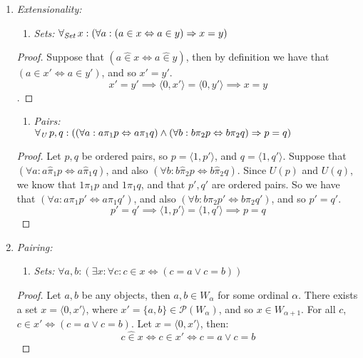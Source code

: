 \documentclass[11pt]{report}
\newcommand{\all}[1]{\forall_{\mathit{#1}}\hspace{0.5mm}}
\newcommand{\pleft}{\mathrel{\pi_1}}
\newcommand{\pright}{\mathrel{\pi_2}}
\newcommand{\pair}[2]{\langle #1,#2 \rangle}
\newcommand{\zin}{\mathrel{\widehat{\in}}}
\newcommand{\zpright}{\mathrel{\widehat{\pi}_2}}
\newcommand{\zpleft}{\mathrel{\widehat{\pi}_1}}
\theoremstyle{definition}
\theoremstyle{theorem}
\theoremstyle{lemma}
\begin{document}
\begin{enumerate}[resume=axiomlist, label=\Roman*.]
  \item \textit{Extensionality:}
  \begin{enumerate}[series=sublist, label=(\roman*)]
    \item \textit{Sets:} $\all{Set} x: (\forall a: (a\in x \Leftrightarrow a\in y) \Rightarrow x=y)$
  \end{enumerate}
  \begin{proof}
    Suppose that $(a \zin x \Leftrightarrow a\zin y)$, then by definition we have that $(a\in x' \Leftrightarrow a\in y')$, and so $x'=y'$.
    $$x'=y'\implies \pair{0}{x'} = \pair{0}{y'} \implies x = y$$.
  \end{proof}
  \begin{enumerate}[resume=sublist, label=(\roman*)]
    \item \textit{Pairs:}\\
    $\all{U}p,q: ((\forall a: a\pi_1 p \Leftrightarrow a\pi_1 q)\wedge(\forall b: b\pi_2 p \Leftrightarrow b\pi_2 q)\Rightarrow p=q)$
  \end{enumerate}
  \begin{proof}
  Let $p,q$ be ordered pairs, so $p = \pair{1}{p'}$, and $q= \pair{1}{q'}$.
  Suppose that $(\forall a: a\zpleft p \Leftrightarrow a\zpleft q)$, and also $(\forall b: b\zpright p \Leftrightarrow b\zpright q)$.
  Since $U(p)$ and $U(q)$, we know that $1\pleft p$ and $1\pleft q$, and that $p',q'$ are ordered pairs.
  So we have that $(\forall a: a\pleft p' \Leftrightarrow a\pleft q')$, and also $(\forall b: b\pright p' \Leftrightarrow b\pright q')$, and so $p'=q'$.
  $$p'=q' \implies \pair{1}{p'} = \pair{1}{q'} \implies p = q$$
  \end{proof}
  \item \textit{Pairing:}
  \begin{enumerate}[series=sublist, label=(\roman*)]
    \item \textit{Sets:}
    $\forall a,b: (\exists x: \forall c: c\in x \Leftrightarrow (c=a \vee c=b))$
  \end{enumerate}
  \begin{proof}
    Let $a,b$ be any objects, then $a,b\in W_\alpha$ for some ordinal $\alpha$.
    There exists a set $x = \pair{0}{x'}$, where $x'=\{a,b\} \in \mathcal{P}(W_\alpha)$, and so $x\in W_{\alpha+1}$.
    For all $c$, $c\in x' \Leftrightarrow (c=a \vee c=b)$.
    Let $x = \pair{0}{x'}$, then:
      $$c\zin x \iff c\in x' \iff c = a \vee c = b$$
  \end{proof}


\end{enumerate}
\end{document}
